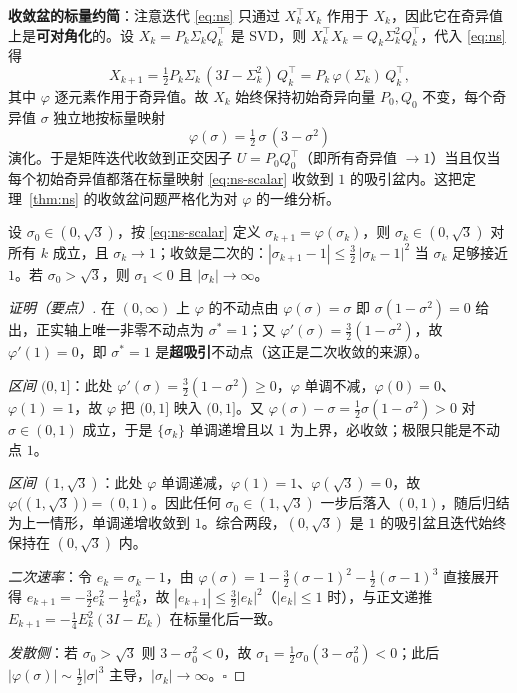 \textbf{收敛盆的标量约简}：注意迭代 \eqref{eq:ns} 只通过 $X_k^\top X_k$ 作用于 $X_k$，因此它在奇异值上是\textbf{可对角化}的。设 $X_k = P_k \Sigma_k Q_k^\top$ 是 SVD，则 $X_k^\top X_k = Q_k \Sigma_k^2 Q_k^\top$，代入 \eqref{eq:ns} 得
\begin{equation}
  X_{k+1} = \tfrac{1}{2} P_k \Sigma_k\,(3I - \Sigma_k^2)\,Q_k^\top
          = P_k\,\varphi(\Sigma_k)\,Q_k^\top,
  \label{eq:ns-svd}
\end{equation}
其中 $\varphi$ 逐元素作用于奇异值。故 $X_k$ 始终保持初始奇异向量 $P_0,Q_0$ 不变，每个奇异值 $\sigma$ 独立地按标量映射
\begin{equation}
  \varphi(\sigma) = \tfrac{1}{2}\,\sigma\,(3 - \sigma^2)
  \label{eq:ns-scalar}
\end{equation}
演化。于是矩阵迭代收敛到正交因子 $U=P_0 Q_0^\top$（即所有奇异值 $\to 1$）当且仅当每个初始奇异值都落在标量映射 \eqref{eq:ns-scalar} 收敛到 $1$ 的吸引盆内。这把定理~\ref{thm:ns} 的收敛盆问题严格化为对 $\varphi$ 的一维分析。

\begin{proposition}
\label{prop:basin}
设 $\sigma_0 \in (0,\sqrt 3)$，按 \eqref{eq:ns-scalar} 定义 $\sigma_{k+1}=\varphi(\sigma_k)$，则 $\sigma_k \in (0,\sqrt 3)$ 对所有 $k$ 成立，且 $\sigma_k \to 1$；收敛是二次的：$|\sigma_{k+1}-1| \le \tfrac{3}{2}\,|\sigma_k - 1|^2$ 当 $\sigma_k$ 足够接近 $1$。若 $\sigma_0 > \sqrt 3$，则 $\sigma_1 < 0$ 且 $|\sigma_k|\to\infty$。
\end{proposition}

\begin{proof}[证明（要点）]
在 $(0,\infty)$ 上 $\varphi$ 的不动点由 $\varphi(\sigma)=\sigma$ 即 $\sigma(1-\sigma^2)=0$ 给出，正实轴上唯一非零不动点为 $\sigma^*=1$；又 $\varphi'(\sigma)=\tfrac{3}{2}(1-\sigma^2)$，故 $\varphi'(1)=0$，即 $\sigma^*=1$ 是\textbf{超吸引}不动点（这正是二次收敛的来源）。

\emph{区间 $(0,1]$}：此处 $\varphi'(\sigma)=\tfrac{3}{2}(1-\sigma^2)\ge 0$，$\varphi$ 单调不减，$\varphi(0)=0$、$\varphi(1)=1$，故 $\varphi$ 把 $(0,1]$ 映入 $(0,1]$。又 $\varphi(\sigma)-\sigma=\tfrac{1}{2}\sigma(1-\sigma^2)>0$ 对 $\sigma\in(0,1)$ 成立，于是 $\{\sigma_k\}$ 单调递增且以 $1$ 为上界，必收敛；极限只能是不动点 $1$。

\emph{区间 $(1,\sqrt 3)$}：此处 $\varphi$ 单调递减，$\varphi(1)=1$、$\varphi(\sqrt3)=0$，故 $\varphi\bigl((1,\sqrt3)\bigr)=(0,1)$。因此任何 $\sigma_0\in(1,\sqrt3)$ 一步后落入 $(0,1)$，随后归结为上一情形，单调递增收敛到 $1$。综合两段，$(0,\sqrt3)$ 是 $1$ 的吸引盆且迭代始终保持在 $(0,\sqrt3)$ 内。

\emph{二次速率}：令 $e_k=\sigma_k-1$，由 $\varphi(\sigma)=1-\tfrac{3}{2}(\sigma-1)^2-\tfrac{1}{2}(\sigma-1)^3$ 直接展开得 $e_{k+1}=-\tfrac{3}{2}e_k^2-\tfrac{1}{2}e_k^3$，故 $|e_{k+1}|\le\tfrac{3}{2}|e_k|^2$（$|e_k|\le1$ 时），与正文递推 $E_{k+1}=-\tfrac{1}{4}E_k^2(3I-E_k)$ 在标量化后一致。

\emph{发散侧}：若 $\sigma_0>\sqrt3$ 则 $3-\sigma_0^2<0$，故 $\sigma_1=\tfrac12\sigma_0(3-\sigma_0^2)<0$；此后 $|\varphi(\sigma)|\sim\tfrac12|\sigma|^3$ 主导，$|\sigma_k|\to\infty$。$\square$
\end{proof}

